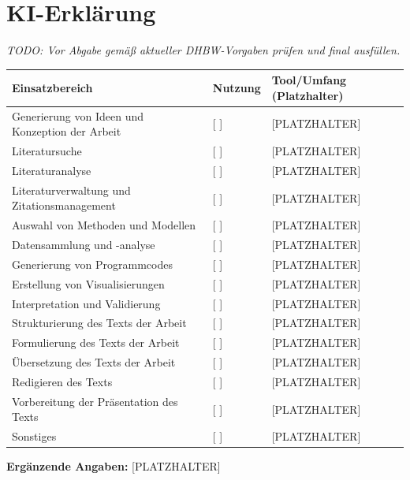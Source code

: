 \section{KI-Erklärung}

\textit{TODO: Vor Abgabe gemäß aktueller DHBW-Vorgaben prüfen und final ausfüllen.}

\begin{longtable}{p{}p{}p{}}
\toprule
\textbf{Einsatzbereich} & \textbf{Nutzung} & \textbf{Tool/Umfang (Platzhalter)} \\
\midrule
Generierung von Ideen und Konzeption der Arbeit & [ ] & [PLATZHALTER] \\
Literatursuche & [ ] & [PLATZHALTER] \\
Literaturanalyse & [ ] & [PLATZHALTER] \\
Literaturverwaltung und Zitationsmanagement & [ ] & [PLATZHALTER] \\
Auswahl von Methoden und Modellen & [ ] & [PLATZHALTER] \\
Datensammlung und -analyse & [ ] & [PLATZHALTER] \\
Generierung von Programmcodes & [ ] & [PLATZHALTER] \\
Erstellung von Visualisierungen & [ ] & [PLATZHALTER] \\
Interpretation und Validierung & [ ] & [PLATZHALTER] \\
Strukturierung des Texts der Arbeit & [ ] & [PLATZHALTER] \\
Formulierung des Texts der Arbeit & [ ] & [PLATZHALTER] \\
Übersetzung des Texts der Arbeit & [ ] & [PLATZHALTER] \\
Redigieren des Texts & [ ] & [PLATZHALTER] \\
Vorbereitung der Präsentation des Texts & [ ] & [PLATZHALTER] \\
Sonstiges & [ ] & [PLATZHALTER] \\
\bottomrule
\end{longtable}

\textbf{Ergänzende Angaben:} [PLATZHALTER]
